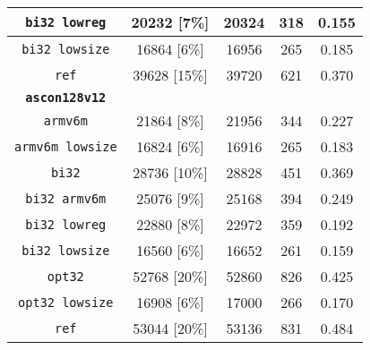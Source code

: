 \begin{table}[h]
\begin{tabular}{|c|c|c|c|c|}
        \texttt{bi32 lowreg} & 20232 [7\%] & 20324 & 318 & 0.155 \\
        \hline
        \texttt{bi32 lowsize} & 16864 [6\%] & 16956 & 265 & 0.185 \\
        \hline
        \texttt{ref} & 39628 [15\%] & 39720 & 621 & 0.370 \\
        \hline
        \texttt{\textbf{ascon128v12}} & & & & \\
        \hline
        \texttt{armv6m} & 21864 [8\%] & 21956 & 344 & 0.227 \\
        \hline
        \texttt{armv6m lowsize} & 16824 [6\%] & 16916 & 265 & 0.183 \\
        \hline
        \texttt{bi32} & 28736 [10\%] & 28828 & 451 & 0.369 \\
        \hline
        \texttt{bi32 armv6m} & 25076 [9\%] & 25168 & 394 & 0.249 \\
        \hline
        \texttt{bi32 lowreg} & 22880 [8\%] & 22972 & 359 & 0.192 \\
        \hline
        \texttt{bi32 lowsize} & 16560 [6\%] & 16652 & 261 & 0.159 \\
        \hline
        \texttt{opt32} & 52768 [20\%] & 52860 & 826 & 0.425 \\
        \hline
        \texttt{opt32 lowsize} & 16908 [6\%] & 17000 & 266 & 0.170 \\
        \hline
        \texttt{ref} & 53044 [20\%] & 53136 & 831 & 0.484 \\
        \hline
    \end{tabular}
\end{table}

